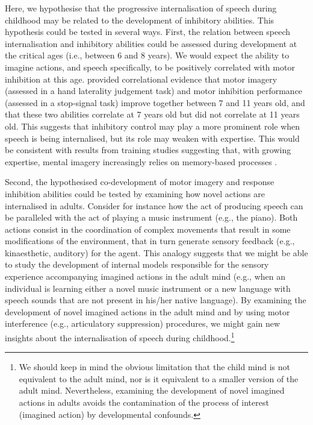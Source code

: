\documentclass[utf8]{template/frontiersSCNS} %
\begin{document}
Here, we hypothesise that the progressive internalisation of speech during childhood may be related to the development of inhibitory abilities. This hypothesis could be tested in several ways. First, the relation between speech internalisation and inhibitory abilities could be assessed during development at the critical ages (i.e., between 6 and 8 years). We would expect the ability to imagine actions, and speech specifically, to be positively correlated with motor inhibition at this age. \cite{wang_relationship_2021} provided correlational evidence that motor imagery (assessed in a hand laterality judgement task) and motor inhibition performance (assessed in a stop-signal task) improve together between 7 and 11 years old, and that these two abilities correlate at 7 years old but did not correlate at 11 years old. This suggests that inhibitory control may play a more prominent role when speech is being internalised, but its role may weaken with expertise. This would be consistent with results from training studies suggesting that, with growing expertise, mental imagery increasingly relies on memory-based processes  \citep[e.g.,][]{tarr_mental_1989, jolicoeur_time_1985}.

Second, the hypothesised co-development of motor imagery and response inhibition abilities could be tested by examining how novel actions are internalised in adults. Consider for instance how the act of producing speech can be paralleled with the act of playing a music instrument (e.g., the piano). Both actions consist in the coordination of complex movements that result in some modifications of the environment, that in turn generate sensory feedback (e.g., kinaesthetic, auditory) for the agent. This analogy suggests that we might be able to study the development of internal models responsible for the sensory experience accompanying imagined actions in the adult mind (e.g., when an individual is learning either a novel music instrument or a new language with speech sounds that are not present in his/her native language). By examining the development of novel imagined actions in the adult mind and by using motor interference (e.g., articulatory suppression) procedures, we might gain new insights about the internalisation of speech during childhood.\footnote{We should keep in mind the obvious limitation that the child mind is not equivalent to the adult mind, nor is it equivalent to a smaller version of the adult mind. Nevertheless, examining the development of novel imagined actions in adults avoids the contamination of the process of interest (imagined action) by developmental confounds.}
\end{document}
